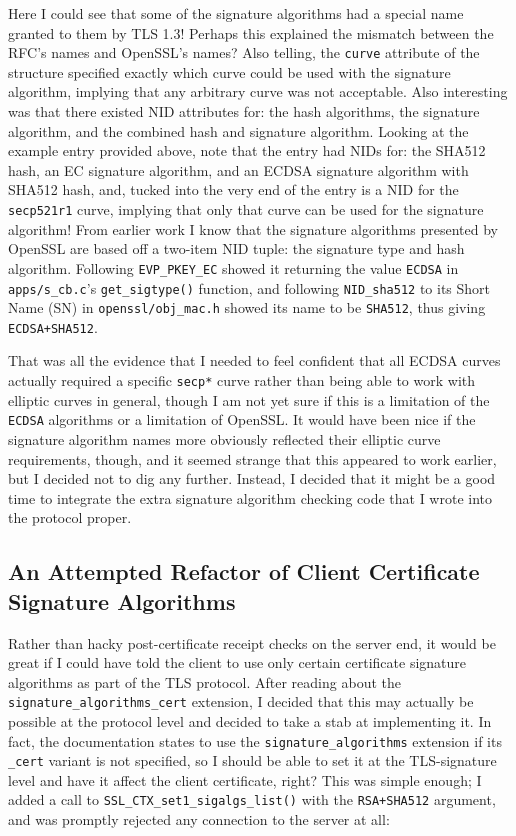 \documentclass{article}
\begin{document}
Here I could see that some of the signature algorithms had a special name granted to them by TLS 1.3!  Perhaps this explained the mismatch between the RFC's names and OpenSSL's names?  Also telling, the \texttt{curve} attribute of the structure specified exactly which curve could be used with the signature algorithm, implying that any arbitrary curve was not acceptable.  Also interesting was that there existed NID attributes for: the hash algorithms, the signature algorithm, and the combined hash and signature algorithm.  Looking at the example entry provided above, note that the entry had NIDs for: the SHA512 hash, an EC signature algorithm, and an ECDSA signature algorithm with SHA512 hash, and, tucked into the very end of the entry is a NID for the \texttt{secp521r1} curve, implying that only that curve can be used for the signature algorithm!  From earlier work I know that the signature algorithms presented by OpenSSL are based off a two-item NID tuple: the signature type and hash algorithm.  Following \texttt{EVP_PKEY_EC} showed it returning the value \texttt{ECDSA} in \texttt{apps/s_cb.c}'s \texttt{get_sigtype()} function, and following \texttt{NID_sha512} to its Short Name (SN) in \texttt{openssl/obj_mac.h} showed its name to be \texttt{SHA512}, thus giving \texttt{ECDSA+SHA512}.

That was all the evidence that I needed to feel confident that all ECDSA curves actually required a specific \texttt{secp*} curve rather than being able to work with elliptic curves in general, though I am not yet sure if this is a limitation of the \texttt{ECDSA} algorithms or a limitation of OpenSSL.  It would have been nice if the signature algorithm names more obviously reflected their elliptic curve requirements, though, and it seemed strange that this appeared to work earlier, but I decided not to dig any further.  Instead, I decided that it might be a good time to integrate the extra signature algorithm checking code that I wrote  into the protocol proper.

\subsection{An Attempted Refactor of Client Certificate Signature Algorithms}
Rather than hacky post-certificate receipt checks on the server end, it would be great if I could have told the client to use only certain certificate signature algorithms as part of the TLS protocol.  After reading about the \texttt{signature_algorithms_cert} extension, I decided that this may actually be possible at the protocol level and decided to take a stab at implementing it.  In fact, the documentation states to use the \texttt{signature_algorithms} extension if its \texttt{_cert} variant is not specified, so I should be able to set it at the TLS-signature level and have it affect the client certificate, right?  This was simple enough; I added a call to \texttt{SSL_CTX_set1_sigalgs_list()} with the \texttt{RSA+SHA512} argument, and was promptly rejected any connection to the server at all:
\end{document}
